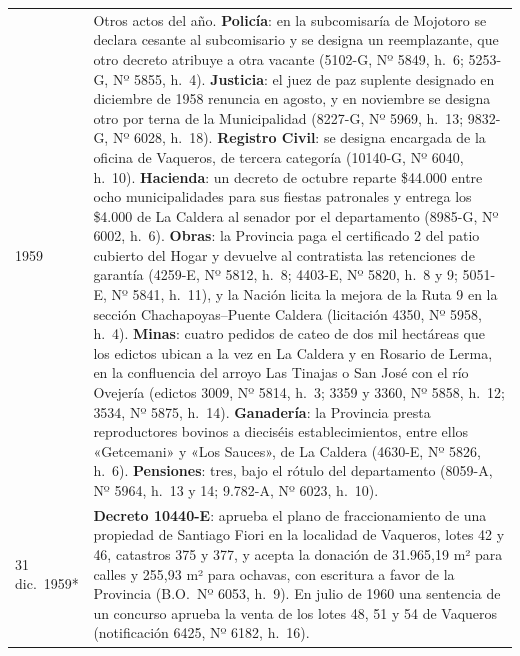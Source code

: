 \begin{longtable}{@{}p{2.7cm}p{10.3cm}@{}}
1959 & Otros actos del año. \textbf{Policía}: en la subcomisaría de Mojotoro se declara cesante al subcomisario y se designa un reemplazante, que otro decreto atribuye a otra vacante (5102-G, Nº 5849, h.\ 6; 5253-G, Nº 5855, h.\ 4). \textbf{Justicia}: el juez de paz suplente designado en diciembre de 1958 renuncia en agosto, y en noviembre se designa otro por terna de la Municipalidad (8227-G, Nº 5969, h.\ 13; 9832-G, Nº 6028, h.\ 18). \textbf{Registro Civil}: se designa encargada de la oficina de Vaqueros, de tercera categoría (10140-G, Nº 6040, h.\ 10). \textbf{Hacienda}: un decreto de octubre reparte \$44.000 entre ocho municipalidades para sus fiestas patronales y entrega los \$4.000 de La Caldera al senador por el departamento (8985-G, Nº 6002, h.\ 6). \textbf{Obras}: la Provincia paga el certificado 2 del patio cubierto del Hogar y devuelve al contratista las retenciones de garantía (4259-E, Nº 5812, h.\ 8; 4403-E, Nº 5820, h.\ 8 y 9; 5051-E, Nº 5841, h.\ 11), y la Nación licita la mejora de la Ruta 9 en la sección Chachapoyas--Puente Caldera (licitación 4350, Nº 5958, h.\ 4). \textbf{Minas}: cuatro pedidos de cateo de dos mil hectáreas que los edictos ubican a la vez en La Caldera y en Rosario de Lerma, en la confluencia del arroyo Las Tinajas o San José con el río Ovejería (edictos 3009, Nº 5814, h.\ 3; 3359 y 3360, Nº 5858, h.\ 12; 3534, Nº 5875, h.\ 14). \textbf{Ganadería}: la Provincia presta reproductores bovinos a dieciséis establecimientos, entre ellos «Getcemani» y «Los Sauces», de La Caldera (4630-E, Nº 5826, h.\ 6). \textbf{Pensiones}: tres, bajo el rótulo del departamento (8059-A, Nº 5964, h.\ 13 y 14; 9.782-A, Nº 6023, h.\ 10). \\
31 dic.\ 1959* & \textbf{Decreto 10440-E}: aprueba el plano de fraccionamiento de una propiedad de Santiago Fiori en la localidad de Vaqueros, lotes 42 y 46, catastros 375 y 377, y acepta la donación de 31.965,19 m² para calles y 255,93 m² para ochavas, con escritura a favor de la Provincia (B.O.\ Nº 6053, h.\ 9). En julio de 1960 una sentencia de un concurso aprueba la venta de los lotes 48, 51 y 54 de Vaqueros (notificación 6425, Nº 6182, h.\ 16). \\

\end{longtable}
